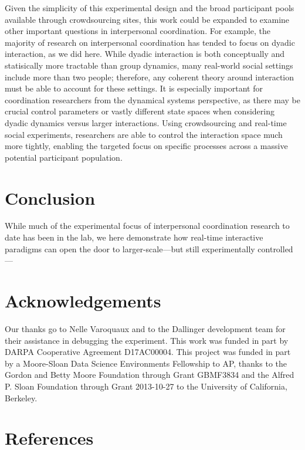 \documentclass[10pt, letterpaper]{article}
\begin{document}
Given the simplicity of this experimental design and the broad
participant pools available through crowdsourcing sites, this work could
be expanded to examine other important questions in interpersonal
coordination. For example, the majority of research on interpersonal
coordination has tended to focus on dyadic interaction, as we did here.
While dyadic interaction is both conceptually and statisically more
tractable than group dynamics, many real-world social settings include
more than two people; therefore, any coherent theory around interaction
must be able to account for these settings. It is especially important
for coordination researchers from the dynamical systems perspective, as
there may be crucial control parameters or vastly different state spaces
when considering dyadic dynamics versus larger interactions. Using
crowdsourcing and real-time social experiments, researchers are able to
control the interaction space much more tightly, enabling the targeted
focus on specific processes across a massive potential participant
population.

\section{Conclusion}\label{conclusion}

While much of the experimental focus of interpersonal coordination
research to date has been in the lab, we here demonstrate how real-time
interactive paradigms can open the door to larger-scale---but still
experimentally controlled---

\section{Acknowledgements}\label{acknowledgements}

Our thanks go to Nelle Varoquaux and to the Dallinger development team
for their assistance in debugging the experiment. This work was funded
in part by DARPA Cooperative Agreement D17AC00004. This project was
funded in part by a Moore-Sloan Data Science Environments Fellowship to
AP, thanks to the Gordon and Betty Moore Foundation through Grant
GBMF3834 and the Alfred P. Sloan Foundation through Grant 2013-10-27 to
the University of California, Berkeley.

\section{References}\label{references}
\end{document}
